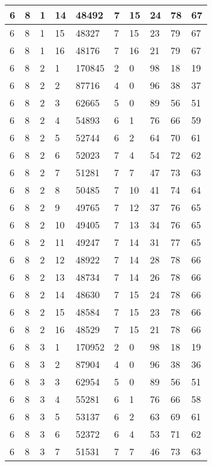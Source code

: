 \begin{table}[!ht]
\begin{tabular}{|l|l|l|l|l|l|l|l|l|l|}
        6 & 8 & 1 & 14 & 48492 & 7 & 15 & 24 & 78 & 67 \\ \hline
        6 & 8 & 1 & 15 & 48327 & 7 & 15 & 23 & 79 & 67 \\ \hline
        6 & 8 & 1 & 16 & 48176 & 7 & 16 & 21 & 79 & 67 \\ \hline
        6 & 8 & 2 & 1 & 170845 & 2 & 0 & 98 & 18 & 19 \\ \hline
        6 & 8 & 2 & 2 & 87716 & 4 & 0 & 96 & 38 & 37 \\ \hline
        6 & 8 & 2 & 3 & 62665 & 5 & 0 & 89 & 56 & 51 \\ \hline
        6 & 8 & 2 & 4 & 54893 & 6 & 1 & 76 & 66 & 59 \\ \hline
        6 & 8 & 2 & 5 & 52744 & 6 & 2 & 64 & 70 & 61 \\ \hline
        6 & 8 & 2 & 6 & 52023 & 7 & 4 & 54 & 72 & 62 \\ \hline
        6 & 8 & 2 & 7 & 51281 & 7 & 7 & 47 & 73 & 63 \\ \hline
        6 & 8 & 2 & 8 & 50485 & 7 & 10 & 41 & 74 & 64 \\ \hline
        6 & 8 & 2 & 9 & 49765 & 7 & 12 & 37 & 76 & 65 \\ \hline
        6 & 8 & 2 & 10 & 49405 & 7 & 13 & 34 & 76 & 65 \\ \hline
        6 & 8 & 2 & 11 & 49247 & 7 & 14 & 31 & 77 & 65 \\ \hline
        6 & 8 & 2 & 12 & 48922 & 7 & 14 & 28 & 78 & 66 \\ \hline
        6 & 8 & 2 & 13 & 48734 & 7 & 14 & 26 & 78 & 66 \\ \hline
        6 & 8 & 2 & 14 & 48630 & 7 & 15 & 24 & 78 & 66 \\ \hline
        6 & 8 & 2 & 15 & 48584 & 7 & 15 & 23 & 78 & 66 \\ \hline
        6 & 8 & 2 & 16 & 48529 & 7 & 15 & 21 & 78 & 66 \\ \hline
        6 & 8 & 3 & 1 & 170952 & 2 & 0 & 98 & 18 & 19 \\ \hline
        6 & 8 & 3 & 2 & 87904 & 4 & 0 & 96 & 38 & 36 \\ \hline
        6 & 8 & 3 & 3 & 62954 & 5 & 0 & 89 & 56 & 51 \\ \hline
        6 & 8 & 3 & 4 & 55281 & 6 & 1 & 76 & 66 & 58 \\ \hline
        6 & 8 & 3 & 5 & 53137 & 6 & 2 & 63 & 69 & 61 \\ \hline
        6 & 8 & 3 & 6 & 52372 & 6 & 4 & 53 & 71 & 62 \\ \hline
        6 & 8 & 3 & 7 & 51531 & 7 & 7 & 46 & 73 & 63 \\ \hline

\end{tabular}
\end{table}
